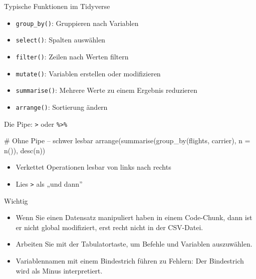 \documentclass[
  ignorenonframetext,
]{beamer}
\newenvironment{Shaded}{\begin{snugshade}}{\end{snugshade}}
\newcommand{\AttributeTok}[1]{\textcolor[rgb]{0.40,0.45,0.13}{#1}}
\newcommand{\CommentTok}[1]{\textcolor[rgb]{0.37,0.37,0.37}{#1}}
\newcommand{\FunctionTok}[1]{\textcolor[rgb]{0.28,0.35,0.67}{#1}}
\newcommand{\NormalTok}[1]{\textcolor[rgb]{0.00,0.23,0.31}{#1}}
\providecommand{\tightlist}{%
  \setlength{\itemsep}{0pt}\setlength{\parskip}{0pt}}
\begin{document}
\begin{frame}[fragile]{Typische Funktionen im Tidyverse}
\protect{}\label{typische-funktionen-im-tidyverse}
\begin{itemize}
\tightlist
\item
  \texttt{group\_by()}: Gruppieren nach Variablen
\item
  \texttt{select()}: Spalten auswählen
\item
  \texttt{filter()}: Zeilen nach Werten filtern
\item
  \texttt{mutate()}: Variablen erstellen oder modifizieren
\item
  \texttt{summarise()}: Mehrere Werte zu einem Ergebnis reduzieren
\item
  \texttt{arrange()}: Sortierung ändern
\end{itemize}
\end{frame}

\begin{frame}[fragile]{Die Pipe: \texttt{\textbar{}\textgreater{}} oder
\texttt{\%\textgreater{}\%}}
\protect{}\label{die-pipe-oder}
\begin{Shaded}
\begin{Highlighting}[]
\CommentTok{\# Ohne Pipe – schwer lesbar}
\FunctionTok{arrange}\NormalTok{(}\FunctionTok{summarise}\NormalTok{(}\FunctionTok{group\_by}\NormalTok{(flights, carrier), }\AttributeTok{n =} \FunctionTok{n}\NormalTok{()), }\FunctionTok{desc}\NormalTok{(n))}
\end{Highlighting}
\end{Shaded}

\begin{itemize}
\tightlist
\item
  Verkettet Operationen lesbar von links nach rechts
\item
  Lies \texttt{\textbar{}\textgreater{}} als „und dann''
\end{itemize}
\end{frame}

\begin{frame}{Wichtig}
\protect{}\label{wichtig}
\begin{itemize}
\tightlist
\item
  Wenn Sie einen Datensatz manipuliert haben in einem Code-Chunk, dann
  ist er nicht global modifiziert, erst recht nicht in der CSV-Datei.
\item
  Arbeiten Sie mit der Tabulatortaste, um Befehle und Variablen
  auszuwählen.
\item
  Variablennamen mit einem Bindestrich führen zu Fehlern: Der
  Bindestrich wird als Minus interpretiert.
\end{itemize}
\end{frame}
\end{document}
